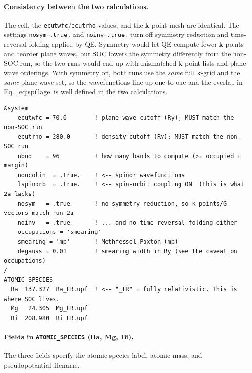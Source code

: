 \documentclass[11pt]{article}
\newcommand{\kk}{\mathbf{k}}
\begin{document}
\paragraph{Consistency between the two calculations.} The cell, the
\texttt{ecutwfc}/\texttt{ecutrho} values, and the $\kk$-point mesh are identical. The settings
\texttt{nosym=.true.} and
\texttt{noinv=.true.} turn off symmetry reduction and time-reversal folding applied
by QE. Symmetry would let QE compute fewer $\kk$-points and reorder plane waves, but SOC lowers the
symmetry differently from the non-SOC run, so the two runs would end up with mismatched $\kk$-point
lists and plane-wave orderings. With symmetry off, both runs use the \emph{same} full $\kk$-grid and
the \emph{same} plane-wave set, so the wavefunctions line up one-to-one and the overlap in
Eq.~\eqref{eq:spillage} is well defined in the two calculations.

\begin{lstlisting}[caption={Relevant parameters in the SOC input file for BaMg2Bi2.},label={lst:soc-input}]
&system
    ecutwfc = 70.0        ! plane-wave cutoff (Ry); MUST match the non-SOC run
    ecutrho = 280.0       ! density cutoff (Ry); MUST match the non-SOC run
    nbnd    = 96          ! how many bands to compute (>= occupied + margin)
    noncolin  = .true.    ! <-- spinor wavefunctions
    lspinorb  = .true.    ! <-- spin-orbit coupling ON  (this is what 2a lacks)
    nosym   = .true.      ! no symmetry reduction, so k-points/G-vectors match run 2a
    noinv   = .true.      ! ... and no time-reversal folding either
    occupations = 'smearing'
    smearing = 'mp'       ! Methfessel-Paxton (mp)
    degauss = 0.01        ! smearing width in Ry (see the caveat on occupations)
/
ATOMIC_SPECIES
  Ba  137.327  Ba_FR.upf  ! <-- "_FR" = fully relativistic. This is where SOC lives.
  Mg   24.305  Mg_FR.upf
  Bi  208.980  Bi_FR.upf
\end{lstlisting}

\paragraph{Fields in \texttt{ATOMIC\_SPECIES} (Ba, Mg, Bi).} The three fields specify the atomic
species label, atomic mass, and pseudopotential filename.
\end{document}

